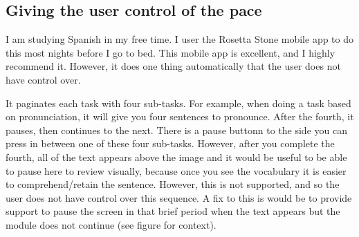 \subsection{Giving the user control of the pace}
I am studying Spanish in my free time. I user the Rosetta Stone mobile app to do this most nights before I go to bed. This mobile app is excellent, and I highly recommend it. However, it does one thing automatically that the user does not have control over.

It paginates each task with four sub-tasks. For example, when doing a task based on pronunciation, it will give you four sentences to pronounce. After the fourth, it pauses, then continues to the next. There is a pause buttonn to the side you can press in between one of these four sub-tasks. However, after you complete the fourth, all of the text appears above the image and it would be useful to be able to pause here to review visually, because once you see the vocabulary it is easier to comprehend/retain the sentence. However, this is not supported, and so the user does not have control over this sequence. A fix to this is would be to provide support to pause the screen in that brief period when the text appears but the module does not continue (see figure for context).


